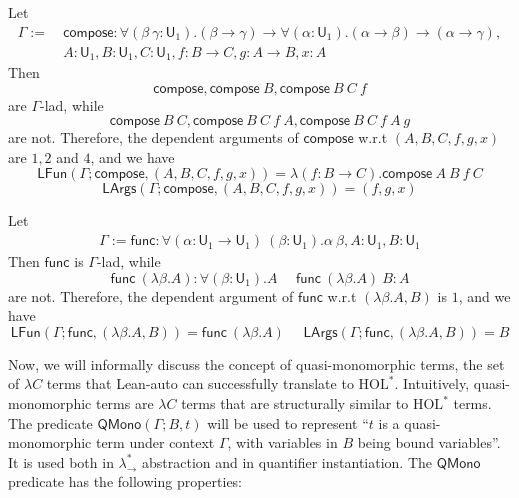 \begin{example} Let
  \begin{align*}
    \Gamma := & \ \mathsf{compose} : \forall (\beta \ \gamma: \mathsf{U}_1).
      (\beta \to \gamma) \to \forall (\alpha : \mathsf{U}_1). (\alpha \to \beta) \to (\alpha \to \gamma), \\
      & \ A : \mathsf{U}_1, B : \mathsf{U}_1, C : \mathsf{U}_1, f : B \to C, g : A \to B, x : A
  \end{align*}
  Then
  $$\mathsf{compose}, \mathsf{compose} \ B, \mathsf{compose} \ B \ C \ f$$
  are $\Gamma$-lad, while
  $$\mathsf{compose} \ B \ C, \mathsf{compose} \ B \ C \ f \ A, \mathsf{compose} \ B \ C \ f \ A \ g$$
  are not. Therefore, the dependent arguments of $\mathsf{compose}$ w.r.t $(A, B, C, f, g, x)$
  are $1, 2$ and $4$, and we have
  $$\mathsf{LFun}(\Gamma; \mathsf{compose}, (A, B, C, f, g, x)) = \lambda (f : B \to C). \mathsf{compose} \ A \ B \ f \ C$$
  $$\mathsf{LArgs}(\Gamma; \mathsf{compose}, (A, B, C, f, g, x)) = (f, g, x)$$
\end{example}

\begin{example} Let
  \begin{align*}
    \Gamma := \mathsf{func} : \forall (\alpha : \mathsf{U}_1 \to \mathsf{U}_1) \ (\beta : \mathsf{U}_1). \alpha \ \beta,
      A : \mathsf{U}_1, B : \mathsf{U}_1 
  \end{align*}
  Then $\mathsf{func}$ is $\Gamma$-lad, while
  $$\mathsf{func} \ (\lambda \beta. A) : \forall (\beta : \mathsf{U}_1). A \ \ \ \ \ \
  \mathsf{func} \ (\lambda \beta. A) \ B : A$$
  are not. Therefore, the dependent argument of $\mathsf{func}$ w.r.t $(\lambda \beta. A, B)$ is $1$, and
  we have
  $$\mathsf{LFun}(\Gamma; \mathsf{func}, (\lambda \beta. A, B)) = \mathsf{func} \ (\lambda \beta . A) \ \ \ \ \ \
  \mathsf{LArgs}(\Gamma; \mathsf{func}, (\lambda \beta. A, B)) = B$$
\end{example}

  Now, we will informally discuss the concept of quasi-monomorphic terms, the set of $\lambda C$ terms
  that Lean-auto can successfully translate to $\text{HOL}^*$. Intuitively, quasi-monomorphic
  terms are $\lambda C$ terms that are structurally similar to $\text{HOL}^*$ terms. The
  predicate $\mathsf{QMono}(\Gamma; B, t)$ will be used to represent ``$t$ is a quasi-monomorphic
  term under context $\Gamma$, with variables in $B$ being bound variables''. It
  is used both in $\lambda_\to^*$ abstraction and in quantifier instantiation.
  The $\mathsf{QMono}$ predicate has the following properties:

